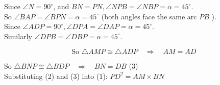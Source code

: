 \documentclass{article}
\begin{document}
Since \(\angle N=90^{\circ}\), and \(B N=P N, \angle N P B=\angle N B P=\alpha=45^{\circ}\).\\
So \(\angle B A P=\angle B P N=\alpha=45^{\circ}\) (both angles face the same arc \(P B\) ).\\
Since \(\angle A D P=90^{\circ}, \angle D P A=\angle D A P=\alpha=45^{\circ}\).\\
Similarly \(\angle D P B=\angle D B P=\alpha=45^{\circ}\).

\[
\text { So } \triangle A M P \cong \triangle A D P \quad \Rightarrow \quad A M=A D
\]

So \(\triangle B N P \cong \triangle B D P \quad \Rightarrow \quad B N=D B\) (3)\\
Substituting (2) and (3) into (1): \(P D^{2}=A M \times B N\)\\
\end{document}
